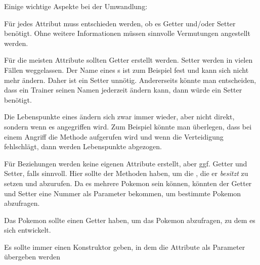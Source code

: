 \documentclass[a4paper,ngerman,fontsize=10pt]{scrartcl}
\begin{document}
Einige wichtige Aspekte bei der Umwandlung:
\begin{smallitem}
	\item Für jedes Attribut muss entschieden werden, ob es Getter und/oder Setter
			benötigt. Ohne weitere Informationen müssen sinnvolle Vermutungen
			angestellt werden.

			Für die meisten Attribute sollten Getter erstellt werden. Setter werden in
			vielen Fällen weggelassen. Der Name eines s ist zum Beispiel
			fest und kann sich nicht mehr ändern. Daher ist ein Setter unnötig.
			Andererseits könnte man entscheiden, dass ein Trainer seinen Namen jederzeit
			ändern kann, dann würde ein Setter benötigt.

			Die Lebenspunkte eines  ändern sich zwar immer wieder, aber nicht
			direkt, sondern wenn es angegriffen wird. Zum Beispiel könnte man überlegen, dass
			bei einem Angriff die Methode  aufgerufen wird und wenn die
			Verteidigung fehlschlägt, dann werden Lebenspunkte abgezogen.
	\item Für Beziehungen werden keine eigenen Attribute erstellt, aber ggf.
			Getter und Setter, falls sinnvoll.
			Hier sollte der  Methoden haben, um die ,
			die er \emph{besitzt} zu setzen und abzurufen. Da es mehrere Pokemon
			sein können, könnten der Getter und Setter eine Nummer als Parameter
			bekommen, um bestimmte Pokemon abzufragen.

			Das Pokemon sollte einen Getter haben, um das Pokemon abzufragen,
			zu dem es sich entwickelt.
	\item Es sollte immer einen Konstruktor geben, in dem die Attribute als
			Parameter übergeben werden
\end{smallitem}
\end{document}
